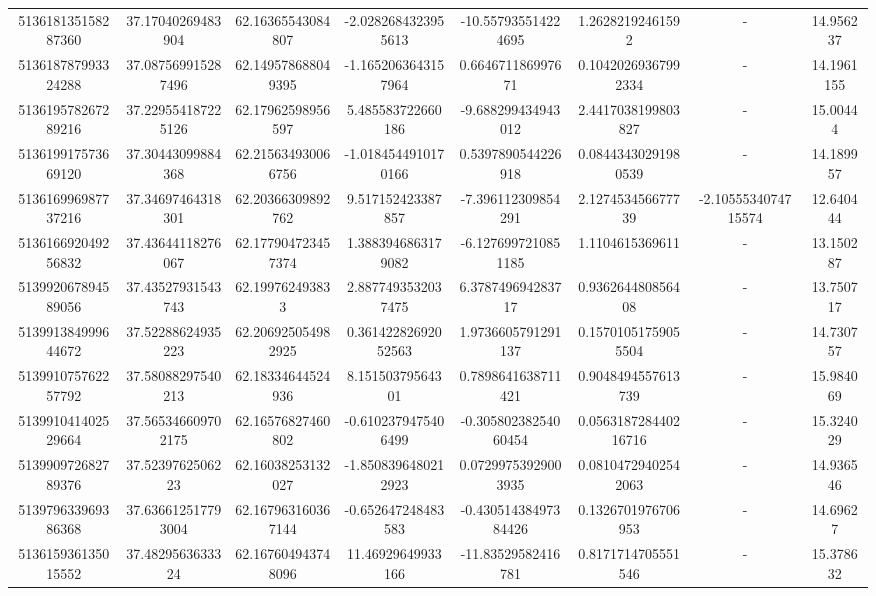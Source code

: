 \documentclass{article}
\begin{document}
\begin{landscape}
\begin{longtable}[c]{S[table-format=18.0]S[table-format=2.15]S[table-format=2.15]S[table-format=-2.17]S[table-format=-2.16]S[table-format=-2.16]S[table-format=-3.16]S[table-format=2.7]}
513618135158287360 & 37.17040269483904  & 62.16365543084807  & -2.0282684323955613  & -10.557935514224695  & 1.26282192461592     & {-}                  & 14.956237  \\
513618787993324288 & 37.087569915287496 & 62.149578688049395 & -1.1652063643157964  & 0.664671186997671    & 0.10420269367992334  & {-}                  & 14.1961155 \\
513619578267289216 & 37.229554187225126 & 62.17962598956597  & 5.485583722660186    & -9.688299434943012   & 2.4417038199803827   & {-}                  & 15.00444   \\
513619917573669120 & 37.30443099884368  & 62.215634930066756 & -1.0184544910170166  & 0.5397890544226918   & 0.08443430291980539  & {-}                  & 14.189957  \\
513616996987737216 & 37.34697464318301  & 62.20366309892762  & 9.517152423387857    & -7.396112309854291   & 2.127453456677739    & -2.1055534074715574 & 12.640444  \\
513616692049256832 & 37.43644118276067  & 62.177904723457374 & 1.3883946863179082   & -6.1276997210851185  & 1.1104615369611      & {-}                  & 13.150287  \\
513992067894589056 & 37.43527931543743  & 62.199762493833    & 2.8877493532037475   & 6.378749694283717    & 0.936264480856408    & {-}                  & 13.750717  \\
513991384999644672 & 37.52288624935223  & 62.206925054982925 & 0.36142282692052563  & 1.9736605791291137   & 0.15701051759055504  & {-}                  & 14.730757  \\
513991075762257792 & 37.58088297540213  & 62.18334644524936  & 8.15150379564301     & 0.7898641638711421   & 0.9048494557613739   & {-}                  & 15.984069  \\
513991041402529664 & 37.565346609702175 & 62.16576827460802  & -0.6102379475406499  & -0.30580238254060454 & 0.056318728440216716 & {-}                  & 15.324029  \\
513990972682789376 & 37.5239762506223   & 62.16038253132027  & -1.8508396480212923  & 0.07299753929003935  & 0.08104729402542063  & {-}                  & 14.936546  \\
513979633969386368 & 37.636612517793004 & 62.167963160367144 & -0.652647248483583   & -0.43051438497384426 & 0.1326701976706953   & {-}                  & 14.69627   \\
513615936135015552 & 37.4829563633324   & 62.167604943748096 & 11.46929649933166    & -11.83529582416781   & 0.8171714705551546   & {-}                  & 15.378632  \\

\end{longtable}
\end{landscape}
\end{document}
